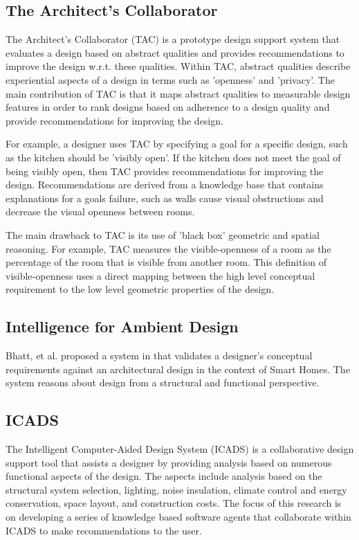\documentclass[12pt]{ucthesis}
\begin{document}
\subsection{The Architect's Collaborator}
The Architect's Collaborator (TAC) \cite{KoileTAC} is a prototype design support system that evaluates a design based on abstract qualities and provides recommendations to improve the design w.r.t. these qualities. Within TAC, abstract qualities describe experiential aspects of a design in terms such as 'openness' and 'privacy'. The main contribution of TAC is that it maps abstract qualities to measurable design features in order to rank designs based on adherence to a design quality and provide recommendations for improving the design. 

For example, a designer uses TAC by specifying a goal for a specific design, such as the kitchen should be 'visibly open'. If the kitchen does not meet the goal of being visibly open, then TAC provides recommendations for improving the design. Recommendations are derived from a knowledge base that contains explanations for a goals failure, such as walls cause visual obstructions and decrease the visual openness between rooms. 

The main drawback to TAC is its use of 'black box' geometric and spatial reasoning. For example, TAC measures the visible-openness of a room as the percentage of the room that is visible from another room. This definition of visible-openness uses a direct mapping between the high level conceptual requirement to the low level geometric properties of the design. 


\subsection{Intelligence for Ambient Design}
Bhatt, et al. proposed a system in \cite{BhattDH09} that validates a designer's conceptual requirements against an architectural design in the context of Smart Homes. The system reasons about design from a structural and functional perspective.   

\subsection{ICADS}
The Intelligent Computer-Aided Design System (ICADS) \cite{ICADS} is a collaborative design support tool that assists a designer by providing analysis based on numerous functional aspects of the design. The aspects include analysis based on the structural system selection, lighting, noise insulation, climate control and energy conservation, space layout, and construction costs. The focus of this research is on developing a series of knowledge based software agents that collaborate within ICADS to make recommendations to the user. 
\end{document}

